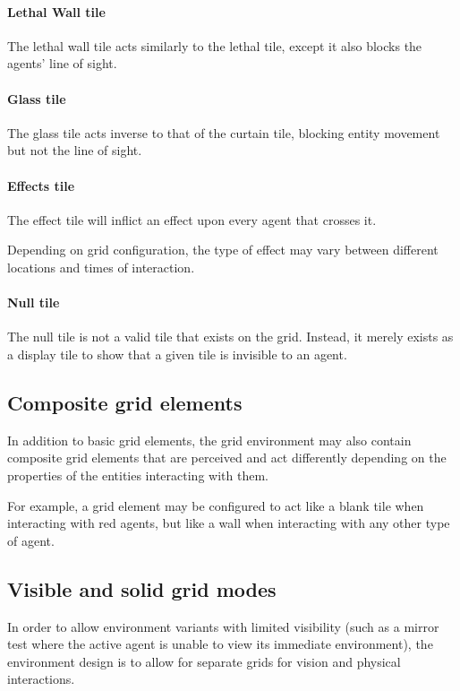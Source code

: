 \documentclass[masterthesis]{fer}
\begin{document}
\paragraph{Lethal Wall tile}
The lethal wall tile acts similarly to the lethal tile, except it also blocks the agents' line of sight.

\paragraph{Glass tile}
The glass tile acts inverse to that of the curtain tile, blocking entity movement but not the line of sight.

\paragraph{Effects tile}
The effect tile will inflict an effect upon every agent that crosses it.

Depending on grid configuration, the type of effect may vary between different locations and times of interaction.

\paragraph{Null tile}
The null tile is not a valid tile that exists on the grid. Instead, it merely exists as a display tile to show that a given tile is invisible to an agent.

\subsection{Composite grid elements}
In addition to basic grid elements, the grid environment may also contain composite grid elements that are perceived and act differently depending on the properties of the entities interacting with them.

For example, a grid element may be configured to act like a blank tile when interacting with red agents, but like a wall when interacting with any other type of agent.

\subsection{Visible and solid grid modes}

In order to allow environment variants with limited visibility (such as a mirror test where the active agent is unable to view its immediate environment), the environment design is to allow for separate grids for vision and physical interactions.
\end{document}
